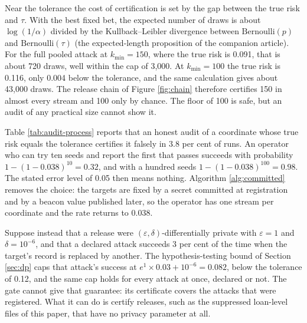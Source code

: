 \begin{example}\label{ex:length}
Near the tolerance the cost of certification is set by the gap between the true
risk and $\tau$. With the best fixed bet, the expected number of draws is about
$\log(1/\alpha)$ divided by the Kullback--Leibler divergence between
$\mathrm{Bernoulli}(p)$ and $\mathrm{Bernoulli}(\tau)$ (the expected-length
proposition of the companion article). For the full pooled attack at
$k_{\min} = 150$, where the true risk is 0.091, that is about 720 draws, well
within the cap of 3{,}000. At $k_{\min} = 100$ the true risk is 0.116, only 0.004
below the tolerance, and the same calculation gives about 43{,}000 draws. The
release chain of Figure \ref{fig:chain} therefore certifies 150 in almost every
stream and 100 only by chance. The floor of 100 is safe, but an audit of any
practical size cannot show it.
\end{example}

\begin{example}\label{ex:grinding}
Table \ref{tab:audit-process} reports that an honest audit of a coordinate whose
true risk equals the tolerance certifies it falsely in 3.8 per cent of runs. An
operator who can try ten seeds and report the first that passes succeeds with
probability $1 - (1 - 0.038)^{10} = 0.32$, and with a hundred seeds
$1 - (1-0.038)^{100} = 0.98$. The stated error level of 0.05 then means nothing.
Algorithm \ref{alg:committed} removes the choice: the targets are fixed by a
secret committed at registration and by a beacon value published later, so the
operator has one stream per coordinate and the rate returns to 0.038.
\end{example}

\begin{example}\label{ex:dp}
Suppose instead that a release were $(\varepsilon,\delta)$-differentially private
with $\varepsilon = 1$ and $\delta = 10^{-6}$, and that a declared attack succeeds
3 per cent of the time when the target's record is replaced by another. The
hypothesis-testing bound of Section \ref{sec:dp} caps that attack's success at
$e^{1}\times 0.03 + 10^{-6} = 0.082$, below the tolerance of 0.12, and the same
cap holds for every attack at once, declared or not. The gate cannot give that
guarantee: its certificate covers the attacks that were registered. What it can
do is certify releases, such as the suppressed loan-level files of this paper,
that have no privacy parameter at all.
\end{example}
